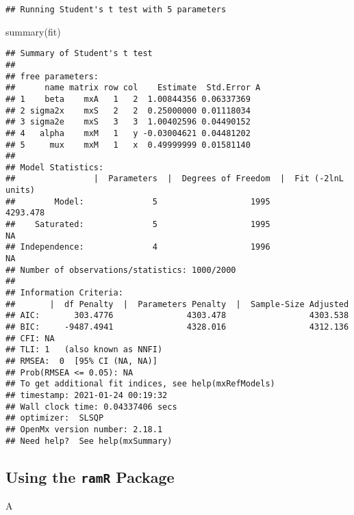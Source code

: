 \documentclass[
]{book}
\newenvironment{Shaded}{\begin{snugshade}}{\end{snugshade}}
\newcommand{\FunctionTok}[1]{\textcolor[rgb]{0.00,0.00,0.00}{#1}}
\newcommand{\NormalTok}[1]{#1}
\theoremstyle{definition}
\theoremstyle{definition}
\theoremstyle{definition}
\theoremstyle{remark}
\begin{document}
\begin{verbatim}
## Running Student's t test with 5 parameters
\end{verbatim}

\begin{Shaded}
\begin{Highlighting}[]
\FunctionTok{summary}\NormalTok{(fit)}
\end{Highlighting}
\end{Shaded}

\begin{verbatim}
## Summary of Student's t test 
##  
## free parameters:
##      name matrix row col    Estimate  Std.Error A
## 1    beta    mxA   1   2  1.00844356 0.06337369  
## 2 sigma2x    mxS   2   2  0.25000000 0.01118034  
## 3 sigma2e    mxS   3   3  1.00402596 0.04490152  
## 4   alpha    mxM   1   y -0.03004621 0.04481202  
## 5     mux    mxM   1   x  0.49999999 0.01581140  
## 
## Model Statistics: 
##                |  Parameters  |  Degrees of Freedom  |  Fit (-2lnL units)
##        Model:              5                   1995              4293.478
##    Saturated:              5                   1995                    NA
## Independence:              4                   1996                    NA
## Number of observations/statistics: 1000/2000
## 
## Information Criteria: 
##       |  df Penalty  |  Parameters Penalty  |  Sample-Size Adjusted
## AIC:       303.4776               4303.478                 4303.538
## BIC:     -9487.4941               4328.016                 4312.136
## CFI: NA 
## TLI: 1   (also known as NNFI) 
## RMSEA:  0  [95% CI (NA, NA)]
## Prob(RMSEA <= 0.05): NA
## To get additional fit indices, see help(mxRefModels)
## timestamp: 2021-01-24 00:19:32 
## Wall clock time: 0.04337406 secs 
## optimizer:  SLSQP 
## OpenMx version number: 2.18.1 
## Need help?  See help(mxSummary)
\end{verbatim}

\hypertarget{using-the-ramr-package-1}{%
\subsection{\texorpdfstring{Using the \texttt{ramR} Package}{Using the ramR Package}}\label{using-the-ramr-package-1}}

\begin{Shaded}
\begin{Highlighting}[]
\NormalTok{A}
\end{Highlighting}
\end{Shaded}
\end{document}
